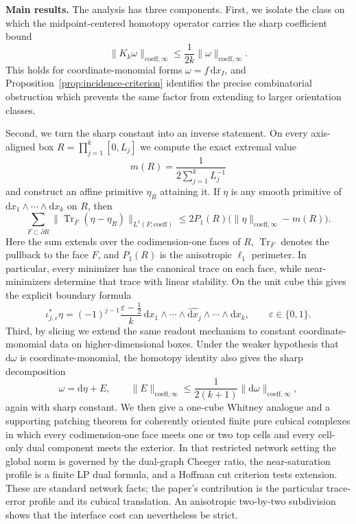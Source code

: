 \documentclass[11pt,letterpaper]{article}
\numberwithin{equation}{section}
\theoremstyle{plain}
\theoremstyle{definition}
\theoremstyle{remark}
\newcommand{\dd}{\mathrm{d}}
\newcommand{\norm}[1]{\lVert #1 \rVert}
\newcommand{\coeff}{\mathrm{coeff}}
\DeclareMathOperator{\Tr}{Tr}
\begin{document}
\medskip
\noindent\textbf{Main results.}
The analysis has three components. First, we isolate the class on which the
midpoint-centered homotopy operator carries the sharp coefficient bound
\[
\norm{K_k\omega}_{\coeff,\infty}\le \frac{1}{2k}\norm{\omega}_{\coeff,\infty}.
\]
This holds for coordinate-monomial forms $\omega=f\,\dd x_I$, and
Proposition~\ref{prop:incidence-criterion} identifies the precise
combinatorial obstruction which prevents the same factor from extending to
larger orientation classes.

Second, we turn the sharp constant into an inverse statement. On every
axis-aligned box $R=\prod_{j=1}^k[0,L_j]$ we compute the exact extremal value
\[
m(R)=\frac{1}{2\sum_{j=1}^k L_j^{-1}}
\]
and construct an affine primitive $\eta_R$ attaining it. If $\eta$ is any
smooth primitive of $\dd x_1\wedge\cdots\wedge\dd x_k$ on $R$, then
\[
\sum_{F\subset\partial R}
\norm{\Tr_F(\eta-\eta_R)}_{L^1(F;\coeff)}
\le
2P_1(R)\bigl(\norm{\eta}_{\coeff,\infty}-m(R)\bigr).
\]
Here the sum extends over the codimension-one faces of $R$, $\Tr_F$ denotes
the pullback to the face $F$, and $P_1(R)$ is the anisotropic $\ell_1$
perimeter. In particular, every minimizer has the canonical trace on each
face, while near-minimizers determine that trace with linear stability. On the
unit cube this gives the explicit boundary formula
\[
\iota_{j,\varepsilon}^\ast\eta
=
(-1)^{j-1}\frac{\varepsilon-\frac12}{k}\,
\dd x_1\wedge\cdots\wedge\widehat{\dd x_j}\wedge\cdots\wedge \dd x_k,
\qquad
\varepsilon\in\{0,1\}.
\]
Third, by slicing we extend the same readout mechanism to constant
coordinate-monomial data on higher-dimensional boxes. Under the weaker
hypothesis that $\dd\omega$ is coordinate-monomial, the homotopy identity also
gives the sharp decomposition
\[
\omega=\dd\eta+E,
\qquad
\norm{E}_{\coeff,\infty}\le \frac{1}{2(k+1)}\norm{\dd\omega}_{\coeff,\infty},
\]
again with sharp constant. We then give a one-cube Whitney analogue and a
supporting patching theorem for coherently oriented finite pure cubical
complexes in which every codimension-one face meets one or two top cells and
every cell-only dual component meets the exterior. In that
restricted network setting the global norm is governed by the dual-graph
Cheeger ratio, the near-saturation profile is a finite LP dual formula, and a
Hoffman cut criterion tests extension. These are standard network facts; the
paper's contribution is the particular trace-error profile and its cubical
translation. An anisotropic two-by-two subdivision shows that the interface
cost can nevertheless be strict.
\end{document}
